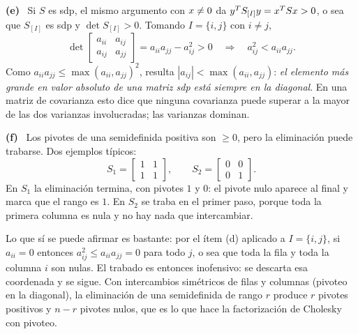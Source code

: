 \documentclass[11pt,a4paper]{article}
\newcommand{\bi}[1]{\boldsymbol{#1}}
\newcommand{\n}[1]{\boldsymbol{#1}}
\DeclareMathOperator{\gen}{span}
\DeclareMathOperator{\tr}{tr}
\DeclareMathOperator{\rg}{rg}
\def\n#1{#1}\def\bi#1{#1}\def\rg{rg}\def\tr{tr}\def\gen{span}%
\newcommand{\itemsol}[1]{\par\medskip\noindent\textbf{(#1)}\ \ignorespaces}
\begin{document}
\itemsol{e} Si $S$ es sdp, el mismo argumento con $\bx\neq\n0$ da
$\by^TS_{[I]}\by=\bx^TS\bx>0$, o sea que $S_{[I]}$ es sdp y $\det S_{[I]}>0$.
Tomando $I=\{i,j\}$ con $i\neq j$,
\[
\det\begin{bmatrix}a_{ii}&a_{ij}\\ a_{ij}&a_{jj}\end{bmatrix}
=a_{ii}a_{jj}-a_{ij}^{2}>0
\quad\Longrightarrow\quad a_{ij}^{2}<a_{ii}a_{jj}.
\]
Como $a_{ii}a_{jj}\le\max(a_{ii},a_{jj})^2$, resulta
$|a_{ij}|<\max(a_{ii},a_{jj})$: \emph{el elemento más grande en valor absoluto de
una matriz sdp está siempre en la diagonal}. En una matriz de covarianza esto
dice que ninguna covarianza puede superar a la mayor de las dos varianzas
involucradas; las varianzas dominan.

\itemsol{f} Los pivotes de una semidefinida positiva son $\ge0$, pero la
eliminación puede trabarse. Dos ejemplos típicos:
\[
S_1=\begin{bmatrix}1&1\\ 1&1\end{bmatrix},\qquad
S_2=\begin{bmatrix}0&0\\ 0&1\end{bmatrix}.
\]
En $S_1$ la eliminación termina, con pivotes $1$ y $0$: el pivote nulo aparece al
final y marca que el rango es $1$. En $S_2$ se traba en el primer paso, porque
toda la primera columna es nula y no hay nada que intercambiar.

Lo que sí se puede afirmar es bastante: por el ítem (d) aplicado a $I=\{i,j\}$,
si $a_{ii}=0$ entonces $a_{ij}^2\le a_{ii}a_{jj}=0$ para todo $j$, o sea que toda
la fila y toda la columna $i$ son nulas. El trabado es entonces inofensivo: se
descarta esa coordenada y se sigue. Con intercambios simétricos de filas y
columnas (pivoteo en la diagonal), la eliminación de una semidefinida de rango
$r$ produce $r$ pivotes positivos y $n-r$ pivotes nulos, que es lo que hace la
factorización de Cholesky con pivoteo.
\end{document}
